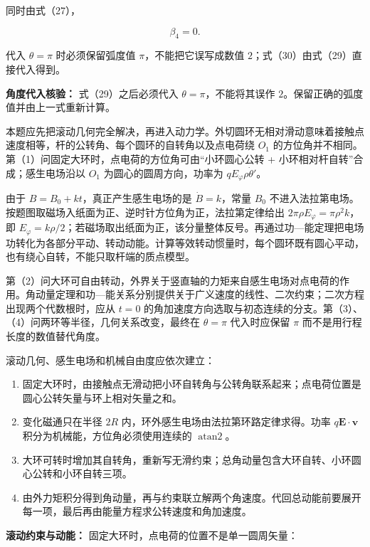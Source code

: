 \documentclass[12pt,a4paper,UTF8]{ctexart}
\newcommand{\tightlist}{\setlength{\itemsep}{0pt}\setlength{\parskip}{0pt}}
\begin{document}
同时由式（27），

\[\boxed{\beta_4=0}. \tag{31}\]

代入 \(\theta=\pi\) 时必须保留弧度值 \(\pi\)，不能把它误写成数值
\(2\)；式（30）由式（29）直接代入得到。

\textbf{角度代入核验：} 式（29）之后必须代入
\(\theta=\pi\)，不能将其误作 \(2\)。保留正确的弧度值并由上一式重新计算。

本题应先把滚动几何完全解决，再进入动力学。外切圆环无相对滑动意味着接触点速度相等，杆的公转角、每个圆环的自转角以及点电荷绕
\(O_1\)
的方位角并不相同。第（1）问固定大环时，点电荷的方位角可由``小环圆心公转
+ 小环相对杆自转''合成；感生电场沿以 \(O_1\) 为圆心的圆周方向，功率为
\(qE_\varphi\rho\dot\theta'\)。

由于 \(B=B_0+kt\)，真正产生感生电场的是 \(\dot B=k\)，常量 \(B_0\)
不进入法拉第电场。按题图取磁场入纸面为正、逆时针方位角为正，法拉第定律给出
\(2\pi\rho E_\varphi=\pi\rho^2k\)，即
\(E_\varphi=k\rho/2\)；若磁场取出纸面为正，该分量整体反号。再通过功---能定理把电场功转化为各部分平动、转动动能。计算等效转动惯量时，每个圆环既有圆心平动，也有绕心自转，不能只取杆端的质点模型。

第（2）问大环可自由转动，外界关于竖直轴的力矩来自感生电场对点电荷的作用。角动量定理和功---能关系分别提供关于广义速度的线性、二次约束；二次方程出现两个代数根时，应从
\(t=0\)
的角加速度方向选取与初态连续的分支。第（3）、（4）问两环等半径，几何关系改变，最终在
\(\theta=\pi\) 代入时应保留 \(\pi\) 而不是用行程长度的数值替代角度。

滚动几何、感生电场和机械自由度应依次建立：

\begin{enumerate}
\def\labelenumi{\arabic{enumi}.}
\tightlist
\item
  固定大环时，由接触点无滑动把小环自转角与公转角联系起来；点电荷位置是圆心公转矢量与环上相对矢量之和。
\item
  变化磁通只在半径 \(2R\) 内，环外感生电场由法拉第环路定律求得。功率
  \(q\boldsymbol E\cdot\boldsymbol v\)
  积分为机械能，方位角必须使用连续的 \(\operatorname{atan2}\)。
\item
  大环可转时增加其自转角，重新写无滑约束；总角动量包含大环自转、小环圆心公转和小环自转三项。
\item
  由外力矩积分得到角动量，再与约束联立解两个角速度。代回总动能前要展开每一项，最后再由能量方程求公转速度和角加速度。
\end{enumerate}

\textbf{滚动约束与动能：} 固定大环时，点电荷的位置不是单一圆周矢量：
\end{document}
